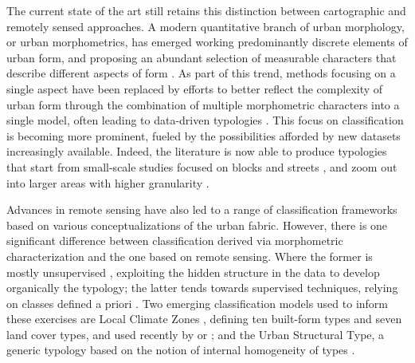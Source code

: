 The current state of the art still retains this distinction between cartographic
and remotely sensed approaches. A modern quantitative branch of urban
morphology, or urban morphometrics, has emerged working predominantly discrete
elements of urban form, and proposing an abundant selection of measurable
characters that describe different aspects of form
\citep{fleischmann2020measuring}. As part of this trend, methods focusing on a
single aspect \citep{porta2006} have been replaced by efforts to better reflect
the complexity of urban form through the combination of multiple morphometric
characters into a single model, often leading to data-driven typologies
\citep{song2007}. This focus on classification is becoming more prominent,
fueled by the possibilities afforded by new datasets increasingly available.
Indeed, the literature is now able to produce typologies that start from
small-scale studies focused on blocks and streets \citep{gil2012}, and zoom out
into larger areas with higher granularity \citep{schirmer2015, araldi2019,
bobkova2019, dibble2019origin, jochem2020}.

Advances in remote sensing have also led to a range of classification
frameworks based on various conceptualizations of the urban fabric. However,
there is one significant difference between classification derived via
morphometric characterization and the one based on remote sensing. Where the
former is mostly unsupervised \citep{araldi2019, schirmer2015}, exploiting the
hidden structure in the data to develop organically the typology; the latter
tends towards supervised techniques, relying on classes defined a priori
\citep{ pauleit2000assessing}. Two emerging classification models used to inform
these exercises are Local Climate Zones \citep{stewart2012}, defining ten
built-form types and seven land cover types, and used recently by
\cite{koc2017mapping} or \cite{taubenbock2020}; and the Urban Structural Type, a
generic typology based on the notion of internal homogeneity of types
\citep{lehner2019}.



